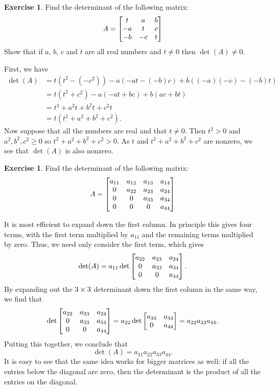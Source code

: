 \documentclass[a4paper]{book}
\theoremstyle{definition}
\newtheorem{exercise}[theorem]{Exercise}
\renewenvironment{solution}{\SolutionInline}{\endSolutionInline}
\begin{document}
\begin{exercise}
 Find the determinant of the following matrix:
 \[ A = \begin{bmatrix}
          t   & a   & b   \\
          -a  & t   & c   \\
          -b  & -c  & t
        \end{bmatrix}
 \]
 Show that if $a$, $b$, $c$ and $t$ are all real numbers and
 $t\neq 0$ then $\det(A)\neq 0$.
\end{exercise}
\begin{solution}
 First, we have
 \begin{align*}
  \det(A) &= t(t^2-(-c^2)) - a(-at-(-b)c) + b((-a)(-c)-(-b)t) \\
          &= t(t^2+c^2) - a(-at+bc) + b(ac+bt) \\
          &= t^3 + a^2t + b^2t + c^2t \\
          &= t(t^2+a^2+b^2+c^2).
 \end{align*}
 Now suppose that all the numbers are real and that $t\neq 0$.  Then
 $t^2>0$ and $a^2,b^2,c^2\geq 0$ so $t^2+a^2+b^2+c^2>0$.  As $t$ and
 $t^2+a^2+b^2+c^2$ are nonzero, we see that $\det(A)$ is also
 nonzero.
\end{solution}

\begin{exercise}
 Find the determinant of the following matrix:
 \[ A =
   \begin{bmatrix} a_{11} & a_{12} & a_{13} & a_{14} \\
        0      & a_{22} & a_{23} & a_{24} \\
        0      & 0      & a_{33} & a_{34} \\
        0      & 0      & 0      & a_{44} \end{bmatrix}
 \]
\end{exercise}
\begin{solution}
 It is most efficient to expand down the first column.  In principle
 this gives four terms, with the first term multiplied by $a_{11}$ and
 the remaining terms multiplied by zero.  Thus, we need only consider
 the first term, which gives
 \[ \det(A) = a_{11}
               \det \begin{bmatrix} a_{22} & a_{23} & a_{24} \\
                         0      & a_{33} & a_{34} \\
                         0      & 0      & a_{44} \end{bmatrix}.
 \]
 By expanding out the $3\times 3$ determinant down the first column in
 the same way, we find that
 \[ \det \begin{bmatrix} a_{22} & a_{23} & a_{24} \\
              0      & a_{33} & a_{34} \\
              0      & 0      & a_{44} \end{bmatrix} =
    a_{22} \det \begin{bmatrix} a_{33} & a_{34} \\ 0 & a_{44} \end{bmatrix} =
    a_{22} a_{33} a_{44}.
 \]
 Putting this together, we conclude that
 \[ \det(A) = a_{11} a_{22} a_{33} a_{44}. \]
 It is easy to see that the same idea works for bigger matrices as
 well: if all the entries below the diagonal are zero, then the
 determinant is the product of all the entries on the diagonal.
\end{solution}
\end{document}
